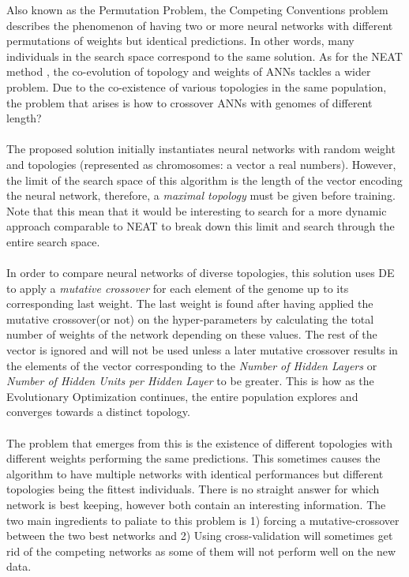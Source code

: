 \documentclass[a4paper,12pt, oneside]{memoir}
\begin{document}
Also known as the Permutation Problem, the Competing Conventions problem describes the phenomenon of having two or more neural networks with different permutations of weights but identical predictions. In other words, many individuals in the search space correspond to the same solution. As for the NEAT method \cite{stanley-2002}, the co-evolution of topology and weights of ANNs tackles a wider problem. Due to the co-existence of various topologies in the same population, the problem that arises is how to crossover ANNs with genomes of different length?
\\ \\
The proposed solution initially instantiates neural networks with random weight and topologies (represented as chromosomes: a vector a real numbers). However, the limit of the search space of this algorithm is the length of the vector encoding the neural network, therefore, a \textit{maximal topology} must be given before training. Note that this mean that it would be interesting to search for a more dynamic approach comparable to NEAT \cite{stanley-2002} to break down this limit and search through the entire search space. 
\\ \\
In order to compare neural networks of diverse topologies, this solution uses DE to apply a \textit{mutative crossover} for each element of the genome up to its corresponding last weight. The last weight is found after having applied the mutative crossover(or not) on the hyper-parameters by calculating the total number of weights of the network depending on these values. The rest of the vector is ignored and will not be used unless a later mutative crossover results in the elements of the vector corresponding to the \textit{Number of Hidden Layers} or \textit{Number of Hidden Units per Hidden Layer} to be greater. This is how as the Evolutionary Optimization continues, the entire population explores and converges towards a distinct topology. 
\\ \\
The problem that emerges from this is the existence of different topologies with different weights performing the same predictions. This sometimes causes the algorithm to have multiple networks with identical performances but different topologies being the fittest individuals. There is no straight answer for which network is best keeping, however both contain an interesting information. The two main ingredients to paliate to this problem is 1) forcing a mutative-crossover between the two best networks and 2) Using cross-validation will sometimes get rid of the competing networks as some of them will not perform well on the new data.
\end{document}
